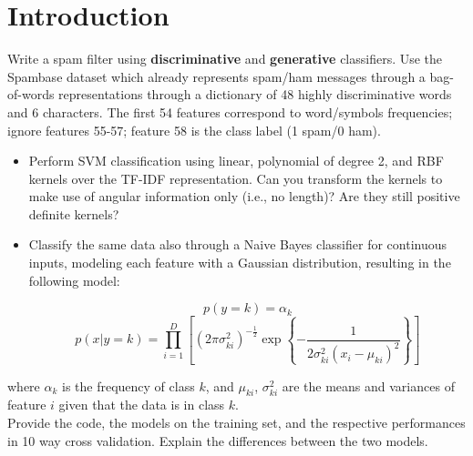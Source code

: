 \documentclass[11pt,a4paper]{article}
\begin{document}

\newcommand{\titolo}  {Assignment 2}
\newcommand{\nome}    {SpamFilter}
\newcommand{\versione}{2.0}





\section {Introduction}
Write a spam filter using \textbf{discriminative} and \textbf{generative} classifiers. Use the Spambase dataset which already represents spam/ham messages through a bag-of-words representations through a dictionary of 48 highly discriminative words and 6 characters. The first 54 features correspond to word/symbols frequencies; ignore features 55-57; feature 58 is the class label (1 spam/0 ham).
\begin{itemize}
	\item Perform SVM classification using linear, polynomial of degree 2, and RBF kernels over the TF-IDF representation. Can you transform the kernels to make use of angular information only (i.e., no length)? Are they still positive definite kernels?
	
	\item Classify the same data also through a Naive Bayes classifier for continuous inputs, modeling each feature with a Gaussian distribution, resulting in the following model:
	
	$$p(y = k) = \alpha_k$$
	$$p(x| y = k) = \prod_{i = 1}^{D} \left[ (2\pi\sigma_{ki}^2)^{-\frac{1}{2}} \exp\left\{-\frac{1}{2\sigma_{ki}^2(x_i - \mu_{ki})^2}\right\}\right]$$
\end{itemize}
where $\alpha_k$ is the frequency of class $k$, and $\mu_{ki}$, $\sigma^2_{ki}$ are the means and variances of feature $i$ given that the data is in class $k$. \\
Provide the code, the models on the training set, and the respective performances in 10 way cross validation. Explain the differences between the two models.\\
\end{document}
